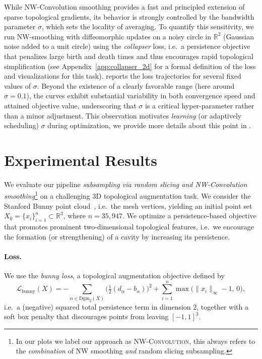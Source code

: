 \documentclass{article} %
\newcommand{\R}{\mathbb{R}}
\newcommand{\Dgm}{\mathrm{Dgm}}
\theoremstyle{plain}
\theoremstyle{definition}
\theoremstyle{remark}
\begin{document}
While NW-Convolution smoothing provides a fast and principled extension of sparse topological gradients, its behavior is
strongly controlled by the bandwidth parameter $\sigma$, which sets the locality of averaging.
To quantify this sensitivity, we run NW-smoothing with diffeomorphic updates on a noisy circle in $\R^2$ (Gaussian noise added to a unit circle) using the \emph{collapser} loss, i.e.\ a persistence objective that penalizes large birth and death times and thus encourages rapid topological simplification (see Appendix~\ref{app:collapser_2d} for a formal definition of the loss
and visualizations for this task).  reports the loss trajectories for several fixed values of $\sigma$. Beyond the existence of a clearly favorable range (here around $\sigma=0.1$), the curves exhibit substantial variability in both convergence speed and attained objective value, underscoring that $\sigma$ is a critical hyper-parameter rather than a minor adjustment. This observation motivates \emph{learning} (or adaptively scheduling) $\sigma$ during optimization, we provide more details about this point in .







\section{Experimental Results}\label{sec:experimental-results}

We evaluate our pipeline \emph{subsampling via random slicing and NW-Convolution smoothing}\footnote{In our plots we label our approach as \textsc{NW-Convolution}, this always refers to the \emph{combination} of NW smoothing \emph{and} random slicing subsampling.} on a challenging $3$D topological augmentation task. We consider the Stanford Bunny point cloud~\citep{bunny}, i.e.\ the mesh vertices, yielding an initial point set $X_0 = \{x_i\}_{i=1}^n \subset \R^3$, where $n = 35,947$. We optimize a persistence-based objective that promotes prominent two-dimensional topological features, i.e.\ we encourage the formation (or strengthening) of a cavity by increasing its persistence.

\paragraph{Loss.}
We use the \emph{bunny loss}, a topological augmentation objective defined by
\begin{equation}
\label{eq:bunny_loss}
\mathcal{L}_{\mathrm{bunny}}(X)
= -\sum_{\alpha\in\Dgm_2(X)}\Big(\tfrac12(d_\alpha-b_\alpha)\Big)^2
+ \sum_{i=1}^n \max\!\big(\|x_i\|_\infty-1,\,0\big),
\end{equation}
i.e.\ a (negative) squared total persistence term in dimension $2$, together with a soft box penalty that discourages points
from leaving $[-1,1]^3$.
\end{document}
